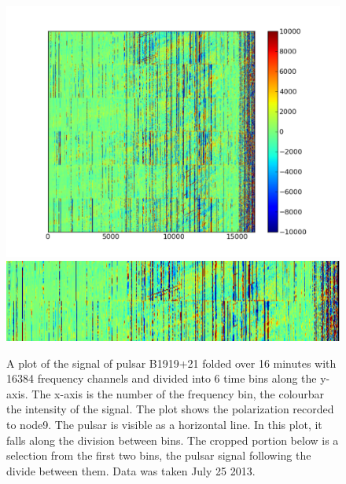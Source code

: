 \documentclass[a4paper,12pt]{article}
\begin{document}
\begin{figure}
\centering
\includegraphics[width=\linewidth]{1919fig1node9.pdf}
\includegraphics[width=\linewidth]{1919fig1node9crop.pdf}
\caption{A plot of the signal of pulsar B1919+21 folded over 16 minutes with 16384 frequency channels and divided into 6 time bins along the y-axis. The x-axis is the number of the frequency bin, the colourbar the intensity of the signal. The plot shows the polarization recorded to node9. The pulsar is visible as a horizontal line. In this plot, it falls along the division between bins. The cropped portion below is a selection from the first two bins, the pulsar signal following the divide between them. Data was taken July 25 2013.}
\label{fig:folding1919}
\end{figure}
\end{document}
